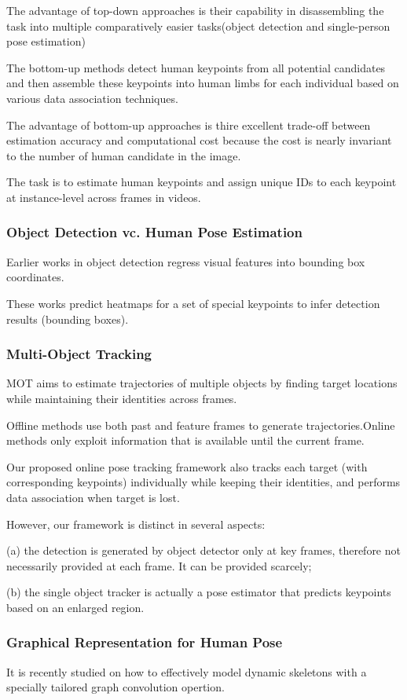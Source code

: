 \documentclass[11pt]{article}
\begin{document}
The advantage of top-down approaches is their capability in disassembling the task into multiple comparatively easier tasks(object detection and single-person pose estimation) 

The bottom-up methods detect human keypoints from all potential candidates and then assemble these keypoints into human limbs for each individual based on various data association techniques.

The advantage of bottom-up approaches is thire excellent trade-off between estimation accuracy and computational cost because the cost is nearly invariant to the number of human candidate in the image.

The task is to estimate human keypoints and assign unique IDs to each keypoint at
instance-level across frames in videos.
\subsubsection{Object Detection vc. Human Pose Estimation}
Earlier works in object detection regress visual features into bounding box coordinates.

These works predict heatmaps for a set of special keypoints to infer detection results (bounding boxes).

\subsubsection{Multi-Object Tracking}
MOT aims to estimate trajectories of multiple objects by finding target locations while maintaining their identities across frames.

Offline methods use both past and feature frames to generate trajectories.Online methods only exploit information that is available until the current frame.

Our proposed online pose tracking framework also tracks each target (with corresponding keypoints) individually while keeping their identities, and performs data association when target is lost.

However, our framework is distinct in several aspects: 

\noindent (a) the detection is generated by object detector only at key frames, therefore not necessarily provided at each frame. It can be provided scarcely;

\noindent (b) the single object tracker is actually a pose estimator that predicts keypoints based on an enlarged region.
\subsubsection{Graphical Representation for Human Pose}
It is recently studied on how to effectively model dynamic skeletons with a specially tailored graph convolution opertion.
\end{document}
